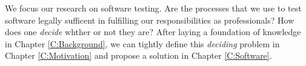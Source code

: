 We focus our research on software testing. Are the processes that we use to test
software legally sufficent in fulfilling our responsibilities as professionals?
How does one \textit{decide} whther or not they are? After laying a foundation
of knowledge in Chapter \ref{C:Background}, we can tightly define this 
\textit{deciding} problem in Chapter \ref{C:Motivation} and propose a solution
in Chapter \ref{C:Software}.
